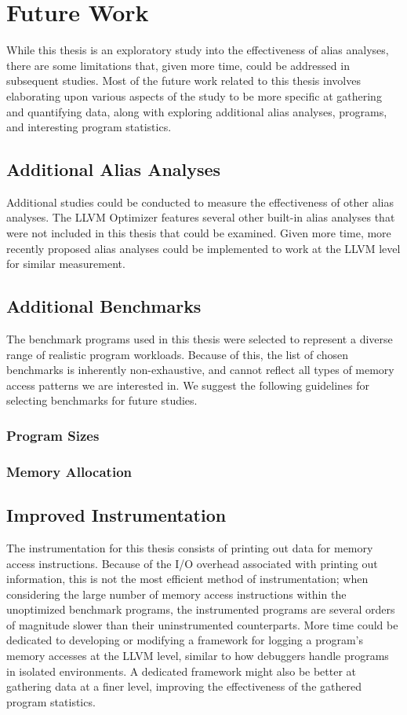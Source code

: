 \chapter{Future Work}

While this thesis is an exploratory study into the effectiveness of alias analyses, there are some limitations that, given more time, could be addressed in subsequent studies. Most of the future work related to this thesis involves elaborating upon various aspects of the study to be more specific at gathering and quantifying data, along with exploring additional alias analyses, programs, and interesting program statistics.

\section{Additional Alias Analyses}
Additional studies could be conducted to measure the effectiveness of other alias analyses. The LLVM Optimizer features several other built-in alias analyses that were not included in this thesis that could be examined. Given more time, more recently proposed alias analyses could be implemented to work at the LLVM level for similar measurement.

\section{Additional Benchmarks}
The benchmark programs used in this thesis were selected to represent a diverse range of realistic program workloads. Because of this, the list of chosen benchmarks is inherently non-exhaustive, and cannot reflect all types of memory access patterns we are interested in. We suggest the following guidelines for selecting benchmarks for future studies.

\subsection{Program Sizes}

\subsection{Memory Allocation}

\section{Improved Instrumentation}
The instrumentation for this thesis consists of printing out data for memory access instructions. Because of the I/O overhead associated with printing out information, this is not the most efficient method of instrumentation; when considering the large number of memory access instructions within the unoptimized benchmark programs, the instrumented programs are several orders of magnitude slower than their uninstrumented counterparts. More time could be dedicated to developing or modifying a framework for logging a program's memory accesses at the LLVM level, similar to how debuggers handle programs in isolated environments. A dedicated framework might also be better at gathering data at a finer level, improving the effectiveness of the gathered program statistics.


